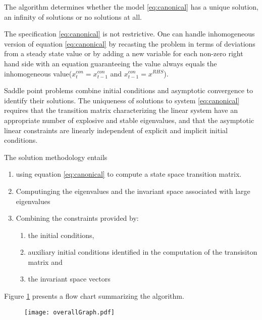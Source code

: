 \documentclass{article}
\begin{document}
The algorithm determines whether
the model \ref{eq:canonical} has a unique solution, an infinity of
 solutions or no solutions at all.

The specification \ref{eq:canonical} is not restrictive.
One can handle inhomogeneous version  of equation \ref{eq:canonical}
by recasting the problem in terms of  deviations from a steady state value or
by adding a new variable for each non-zero right hand side with an equation
guaranteeing the  value always equals  
the inhomogeneous value($x^{con}_t =x^{con}_{t-1}$ and $x^{con}_{t-1} = x^{RHS}$).



Saddle point problems combine initial conditions and asymptotic 
convergence to identify their solutions.
The uniqueness of solutions to 
system  \ref{eq:canonical} requires that
the transition matrix characterizing the linear system have an appropriate
number of explosive and stable eigenvalues\cite{blanchard80},
and that the asymptotic linear constraints 
are linearly independent of explicit and implicit initial 
conditions\cite{ANDER:AIM2}.

The solution methodology entails 
\begin{enumerate}
\item using equation \ref{eq:canonical} to
compute a state space transition matrix.
\item Computinging the eigenvalues and the invariant space associated with
large eigenvalues
\item Combining the constraints provided by:
  \begin{enumerate}
  \item the
initial conditions,
\item  auxiliary initial conditions identified in the computation of the transisiton matrix and 
\item the invariant space vectors
  \end{enumerate}
\end{enumerate}

Figure \ref{fig:overview} presents a flow chart  summarizing the
algorithm. 

\begin{figure}[htbp]
  \begin{center}
\texttt{[image: overallGraph.pdf]}
    \label{fig:overview}
  \end{center}
\end{figure}
\end{document}
